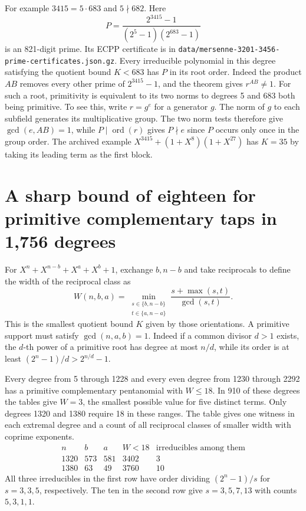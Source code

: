 \documentclass[11pt]{article}
\newcommand{\ord}{\operatorname{ord}}
\begin{document}
For example \(3415=5\cdot683\) and \(5\nmid682\). Here
\[
 P=\frac{2^{3415}-1}{(2^5-1)(2^{683}-1)}
\]
is an 821-digit prime. Its ECPP certificate is in
\nolinkurl{data/mersenne-3201-3456-prime-certificates.json.gz}.
Every irreducible polynomial in this degree satisfying the quotient
bound \(K<683\) has \(P\) in its root order. Indeed the product
\(AB\) removes every other prime of \(2^{3415}-1\), and the theorem
gives \(r^{AB}\ne1\). For such a root, primitivity is equivalent
to its two norms to degrees 5 and 683 both being primitive. To see
this, write \(r=g^e\) for a generator \(g\). The norm of \(g\) to
each subfield generates its multiplicative group. The two norm tests
therefore give \(\gcd(e,AB)=1\), while \(P\mid\ord(r)\) gives
\(P\nmid e\) since \(P\) occurs only once in the group order.
The archived example \(X^{3415}+(1+X^8)(1+X^{27})\) has \(K=35\)
by taking its leading term as the first block.

\section{A sharp bound of eighteen for primitive complementary taps in 1,756 degrees}
\label{sec:complementary-width-witnesses}

For \(X^n+X^{n-b}+X^a+X^b+1\), exchange \(b,n-b\) and take
reciprocals to define the width of the reciprocal class as
\[
 W(n,b,a)=
 \min_{\substack{s\in\{b,n-b\}\\t\in\{a,n-a\}}}
       \frac{s+\max(s,t)}{\gcd(s,t)} .
\]
This is the smallest quotient bound \(K\) given by those orientations.
A primitive support must satisfy \(\gcd(n,a,b)=1\). Indeed if a
common divisor \(d>1\) exists, the \(d\)-th power of a primitive
root has degree at most \(n/d\), while its order is at least
\((2^n-1)/d>2^{n/d}-1\).

Every degree from 5 through 1228 and every even degree from 1230
through 2292 has a primitive complementary pentanomial with \(W\le18\).
In 910 of these degrees the tables give \(W=3\), the smallest
possible value for five distinct terms. Only degrees 1320 and 1380
require 18 in these ranges. The table gives one witness in each
extremal degree and a count of all reciprocal classes of smaller
width with coprime exponents.
\[
\begin{array}{r|rr|rr}
 n&b&a& W<18&\text{irreducibles among them}\\\hline
1320&573&581&3402&3\\
1380&63&49&3760&10
\end{array}
\]
All three irreducibles in the first row have order dividing
\((2^n-1)/s\) for \(s=3,3,5\), respectively. The ten in the second
row give \(s=3,5,7,13\) with counts \(5,3,1,1\).
\end{document}
